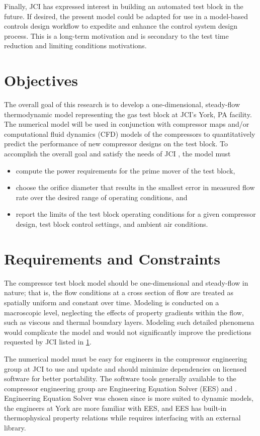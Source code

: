 Finally, JCI has expressed interest in building an automated test block in the future. 
If desired, the present model could be adapted for use in a model-based controls design workflow 
to expedite and enhance the control system design process. 
This is a long-term motivation and is secondary to the test time reduction and limiting conditions motivations.

\section{Objectives} \label{sec:objective}
The overall goal of this research is to develop a one-dimensional, steady-flow thermodynamic model 
representing the  gas test block at JCI's York, PA facility. 
The numerical model will be used in conjunction with compressor maps and/or computational fluid dynamics (CFD)%
models of the compressors to quantitatively predict the performance of new compressor designs on the test block. 
To accomplish the overall goal and satisfy the needs of JCI \citep{iancu2012}, the model must
\begin{itemize}
  \item compute the power requirements for the prime mover of the test block,
  \item choose the orifice diameter that results in the smallest error in measured
    flow rate over the desired range of operating conditions, and 
  \item report the limits of the test block operating conditions for a given compressor 
		design, test block control settings, and ambient air conditions.
\end{itemize}

\section{Requirements and Constraints} \label{sec:requirements}
The compressor test block model should be one-dimensional and steady-flow in nature; 
that is, the flow conditions at a cross section of flow 
are treated as spatially uniform and constant over time. 
Modeling is conducted on a macroscopic level, 
neglecting the effects of property gradients within the flow, 
such as viscous and thermal boundary layers. 
Modeling such detailed phenomena would complicate the model 
and would not significantly improve the predictions requested by JCI listed in \cref{sec:objective}.

The numerical model must be easy for engineers in the compressor engineering group at JCI 
to use and update and should minimize dependencies on licensed software for better portability. 
The software tools generally available to the compressor engineering group are 
Engineering Equation Solver (EES) and \MLS{}. 
Engineering Equation Solver was chosen since \MLS{} is more suited to dynamic models, 
the engineers at York are more familiar with EES, 
and EES has built-in thermophysical property relations 
while \MLS{} requires interfacing with an external library.

